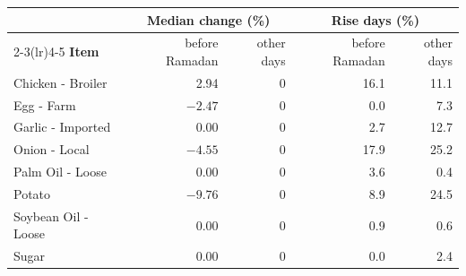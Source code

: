 \begin{tabular}{lrrrr}
\toprule
 & \multicolumn{2}{c}{\textbf{Median change (\%)}} & \multicolumn{2}{c}{\textbf{Rise days (\%)}} \\
\cmidrule(lr){2-3}\cmidrule(lr){4-5}
\textbf{Item} & before Ramadan & other days & before Ramadan & other days \\
\midrule
Chicken - Broiler & 2.94 & 0 & 16.1 & 11.1 \\
Egg - Farm & $-2.47$ & 0 & 0.0 & 7.3 \\
Garlic - Imported & 0.00 & 0 & 2.7 & 12.7 \\
Onion - Local & $-4.55$ & 0 & 17.9 & 25.2 \\
Palm Oil - Loose & 0.00 & 0 & 3.6 & 0.4 \\
Potato & $-9.76$ & 0 & 8.9 & 24.5 \\
Soybean Oil - Loose & 0.00 & 0 & 0.9 & 0.6 \\
Sugar & 0.00 & 0 & 0.0 & 2.4 \\
\bottomrule
\end{tabular}
